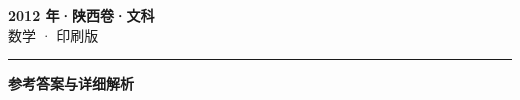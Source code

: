 \documentclass[zihao=5, a4paper]{ctexart}
\begin{document}
\begin{center}
  {\Large\bfseries 2012 年·陕西卷·文科}\\[4pt]
  {\large 数学 · 印刷版}
\end{center}
\medskip
{}

\par\bigskip\hrule\bigskip
{}
\begin{center}{\large\bfseries 参考答案与详细解析}\end{center}
\smallskip

\end{document}
